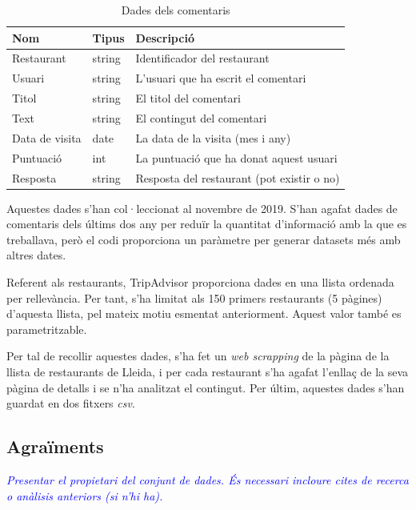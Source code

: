 \documentclass{article}
\newcommand\enunciat[2][blue]{\textcolor{#1}{\emph{#2}}}
\begin{document}
\begin{table}[h]
	\centering
    \begin{tabular}{|p{}|p{}|p{}|}
		\hline
        Nom            & Tipus  & Descripció \\\hline\hline
        Restaurant     & string & Identificador del restaurant\\\hline
        Usuari         & string & L'usuari que ha escrit el comentari \\\hline
        Titol          & string & El titol del comentari \\\hline
        Text           & string & El contingut del comentari \\\hline
        Data de visita & date   & La data de la visita (mes i any) \\\hline
        Puntuació      & int    & La puntuació que ha donat aquest usuari
								  \\\hline
        Resposta       & string & Resposta del restaurant (pot existir o no)
								  \\\hline
    \end{tabular}
    \caption{Dades dels comentaris}
    \label{table:dataset2_data}
\end{table}

Aquestes dades s'han col·leccionat al novembre de 2019. S'han agafat dades de
comentaris dels últims dos any per reduïr la quantitat d'informació amb la que
es treballava, però el codi proporciona un paràmetre per generar datasets més
amb altres dates.

Referent als restaurants, TripAdvisor proporciona dades en una llista ordenada
per rellevància. Per tant, s'ha limitat als 150 primers restaurants (5 pàgines)
d'aquesta llista, pel mateix motiu esmentat anteriorment. Aquest valor també es
parametritzable.
\linebreak

Per tal de recollir aquestes dades, s'ha fet un \textit{web scrapping} de la
pàgina de la llista de restaurants de Lleida, i per cada restaurant s'ha agafat
l'enllaç de la seva pàgina de detalls i se n'ha analitzat el contingut. Per
últim, aquestes dades s'han guardat en dos fitxers \textit{csv}.

\subsection{Agraïments}
\enunciat{Presentar el propietari del conjunt de dades. És necessari incloure
cites de recerca o anàlisis anteriors (si n'hi ha).}
\end{document}
